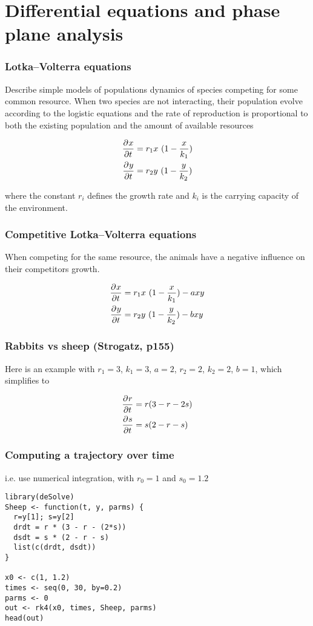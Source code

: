 \documentclass{beamer}
\begin{document}
\section{Differential equations and phase plane analysis}
\label{sec-7}
\begin{frame}
\frametitle{Lotka–Volterra equations}
\label{sec-7-1}


Describe simple models of populations dynamics of species competing for some common resource. 
When two species are not interacting, their population evolve according to the logistic 
equations and the rate of reproduction is proportional to both the existing population 
and the amount of available resources

\begin{align*}
 \frac{\partial^{} {x}}{\partial {t}^{}} &= r_{1} x ~ (1 - \frac{x}{k_{1}} )\\
 \frac{\partial^{} {y}}{\partial {t}^{}} &= r_{2} y ~ (1 - \frac{y}{k_{2}} )
\end{align*}

where the constant $r_{i}$ defines the growth rate and $k_{i}$ is the carrying capacity of the environment.
\end{frame}
\begin{frame}
\frametitle{Competitive Lotka–Volterra equations}
\label{sec-7-2}


When competing for the same resource, the animals have a negative influence on their competitors growth.

\begin{align*}
 \frac{\partial^{} {x}}{\partial {t}^{}} &= r_{1} x ~ (1 - \frac{x}{k_{1}} ) - axy\\
 \frac{\partial^{} {y}}{\partial {t}^{}} &= r_{2} y ~ (1 - \frac{y}{k_{2}} ) - bxy
\end{align*}
\end{frame}
\begin{frame}
\frametitle{Rabbits vs sheep  (Strogatz, p155)}
\label{sec-7-3}


Here is an example with $r_{1} = 3$, $k_{1} = 3$, $a = 2$, $r_{2} = 2$, $k_{2} = 2$, $b = 1$, which simplifies to

\begin{align*}
 \frac{\partial^{} {r}}{\partial {t}^{}} &= r( 3 - r - 2s)\\
 \frac{\partial^{} {s}}{\partial {t}^{}} &= s( 2 - r - s)
\end{align*}
\end{frame}
\begin{frame}[fragile]
\frametitle{Computing a trajectory over time}
\label{sec-7-4}


i.e. use numerical integration, with $r_0 = 1$ and $s_0 = 1.2$


\begin{verbatim}
library(deSolve)
Sheep <- function(t, y, parms) {
  r=y[1]; s=y[2]
  drdt = r * (3 - r - (2*s))
  dsdt = s * (2 - r - s)
  list(c(drdt, dsdt))
}

x0 <- c(1, 1.2)
times <- seq(0, 30, by=0.2)
parms <- 0
out <- rk4(x0, times, Sheep, parms)
head(out)
\end{verbatim}
\end{frame}
\end{document}
